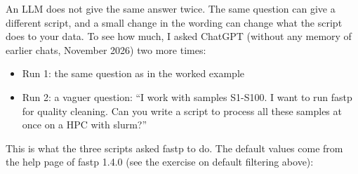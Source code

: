 \documentclass[
  letterpaper,
  DIV=11,
  numbers=noendperiod]{scrreprt}
\providecommand{\tightlist}{%
  \setlength{\itemsep}{0pt}\setlength{\parskip}{0pt}}
\begin{document}
\begin{tcolorbox}[enhanced jigsaw, title=\textcolor{quarto-callout-tip-color}{\faLightbulb}\hspace{0.5em}{Tip: Same question, different script (optional)}, rightrule=.15mm, titlerule=0mm, colframe=quarto-callout-tip-color-frame, toprule=.15mm, leftrule=.75mm, colbacktitle=quarto-callout-tip-color!10!white, bottomtitle=1mm, toptitle=1mm, arc=.35mm, opacitybacktitle=0.6, left=2mm, bottomrule=.15mm, breakable, opacityback=0, colback=white, coltitle=black]

An LLM does not give the same answer twice. The same question can give a
different script, and a small change in the wording can change what the
script does to your data. To see how much, I asked ChatGPT (without any
memory of earlier chats, November 2026) two more times:

\begin{itemize}
\tightlist
\item
  Run 1: the same question as in the worked example
\item
  Run 2: a vaguer question: ``I work with samples S1-S100. I want to run
  fastp for quality cleaning. Can you write a script to process all
  these samples at once on a HPC with slurm?''
\end{itemize}

This is what the three scripts asked fastp to do. The default values
come from the help page of fastp 1.4.0 (see the exercise on default
filtering above):


\end{tcolorbox}
\end{document}
